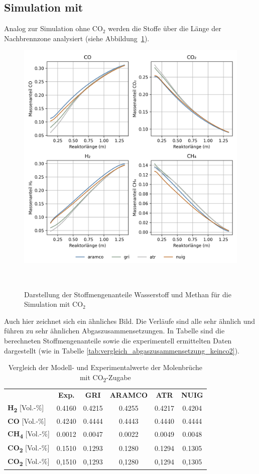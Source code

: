 \documentclass[footmark=none]{tubaf-thesis}
\begin{document}
        \subsection{Simulation mit }
        Analog zur Simulation ohne CO$_2$ werden die Stoffe über die Länge der Nachbrennzone analysiert (siehe Abbildung~\ref{fig:vergleich_h2_ch4_co2}).
        \begin{figure}[H]
            \centering
            \includegraphics[width=0.8\linewidth]{img_py/H2_CH4_CO_CO2.png}
            \caption{Darstellung der Stoffmengenanteile Wasserstoff und Methan für die Simulation mit CO$_2$}~\label{fig:vergleich_h2_ch4_co2}
        \end{figure}
        Auch hier zeichnet sich ein ähnliches Bild. Die Verläufe sind alle sehr ähnlich und führen zu sehr ähnlichen Abgaszusammensetzungen. In Tabelle sind die berechneten Stoffmengenanteile sowie die experimentell ermittelten Daten dargestellt (wie in Tabelle \ref{tab:vergleich_abgaszusammensetzung_keinco2}).
        \begin{table}[H]
            \centering\label{tab:vergleich_abgaszusammensetzung_co2}
            \caption{Vergleich der Modell- und Experimentalwerte der Molenbrüche mit CO\textsubscript{2}-Zugabe}
            \begin{tabular}{lccccc}
                \toprule
                & \textbf{Exp.} & \textbf{GRI} & \textbf{ARAMCO} & \textbf{ATR} & \textbf{NUIG} \\
                \textbf{H\textsubscript{2}} [Vol.-\%]   & 0.4160 & 0.4215 & 0.4255 & 0.4217 & 0.4204 \\
                \textbf{CO} [Vol.-\%]                  & 0.4240 & 0.4444 & 0.4443 & 0.4440 & 0.4444 \\
                \textbf{CH\textsubscript{4}} [Vol.-\%] & 0.0012 & 0.0047 & 0.0022 & 0.0049 & 0.0048 \\
                \textbf{CO\textsubscript{2}} [Vol.-\%] & 0.1510 & 0.1293 & 0.1280 & 0.1294 & 0.1305 \\
                \textbf{CO\textsubscript{2}} [Vol.-\%] & 0{,}1510 & 0{,}1293 & 0{,}1280 & 0{,}1294 & 0{,}1305 \\
                \bottomrule
            \end{tabular}
        \end{table}
\end{document}
